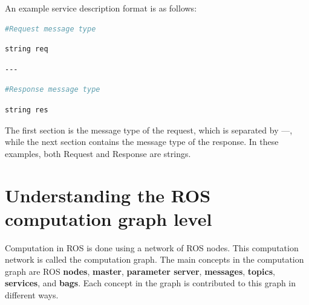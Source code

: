 \documentclass[../../main]{subfiles}
\begin{document}
An example service description format is as follows:
\begin{lstlisting}[language=bash, frame=shadowbox]
    #Request message type
\end{lstlisting}
\begin{lstlisting}[language=bash, frame=shadowbox]
    string req
\end{lstlisting}
\begin{lstlisting}[language=bash, frame=shadowbox]
    ---
\end{lstlisting}
\begin{lstlisting}[language=bash, frame=shadowbox]
    #Response message type
\end{lstlisting}
\begin{lstlisting}[language=bash, frame=shadowbox]
    string res
\end{lstlisting}
The first section is the message type of the request, which is separated by ---, while the
next section contains the message type of the response. In these examples, both Request
and Response are strings.
\section{Understanding the ROS computation graph level}
Computation in ROS is done using a network of ROS nodes. This computation network is called the computation graph. The main concepts in the computation graph are ROS \textbf{nodes}, \textbf{master}, \textbf{parameter server}, \textbf{messages}, \textbf{topics}, \textbf{services}, and \textbf{bags}. Each concept in the graph is contributed to this graph in different ways.
\end{document}
